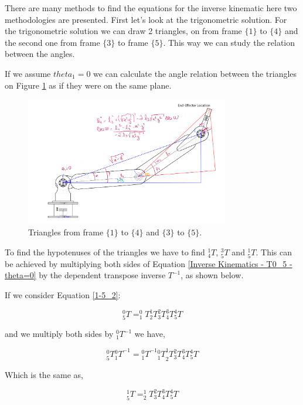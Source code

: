 \documentclass[transmag]{IEEEtran}
\begin{document}
There are many methods to find the equations for the inverse kinematic here two methodologies are presented. First let's look at the trigonometric solution. For the trigonometric solution we can draw 2 triangles, on from frame $\{1\}$ to $\{4\}$ and the second one from frame $\{3\}$ to frame $\{5\}$. This way we can study the relation between the angles. 

If we assume $theta_1 = 0$ we can calculate the angle relation between the triangles on Figure \ref{Inverse_triangles} as if they were on the same plane.

\begin{figure}[h]
\centerline{\includegraphics[width=3.5in]{./images/Inverse_triang}}
\caption{Triangles from frame $\{1\}$ to $\{4\}$ and $\{3\}$ to $\{5\}$.\label{Inverse_triangles}}
\end{figure}

To find the hypotenuses of the triangles we have to find $^1_4T$, $^3_5T$ and $^1_5T$. This can be achieved by multiplying both sides of Equation \ref{Inverse Kinematics - T0_5 - theta=0} by the dependent transpose inverse $T^{-1}$, as shown below.

If we consider Equation \ref{1-5_2}:

\begin{equation}
^0_5T = ^0_1T  ^1_2T  ^2_3T  ^3_4T  ^4_5T
\label{1-5_2}
\end{equation}

and we multiply both sides by $^0_1T^{-1}$ we have,

\begin{equation}
^0_5T {^0_1T}^{-1} = {^0_1T}^{-1} {^0_1T} ^1_2T  ^2_3T  ^3_4T  ^4_5T
\end{equation}

Which is the same as,

\begin{equation}
^1_5T = ^1_2T  ^2_3T  ^3_4T  ^4_5T
\end{equation}
\end{document}
